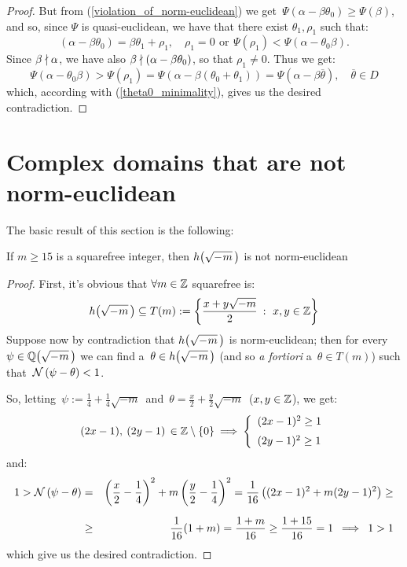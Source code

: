 \begin{proof}
But from (\ref{violation_of_norm-euclidean})
we get\, $\Psi(\alpha - \beta\theta_0) \geq
\Psi(\beta)$, \,and so, since $\Psi$ is
quasi-euclidean, we have that there exist
$\theta_1, \rho_1$ such that:
$$
(\alpha - \beta\theta_0) = \beta\theta_1 + \rho_1,
\quad\! \rho_1 = 0\ \,\textrm{or}\, \ \Psi(\rho_1)
< \Psi(\alpha - \theta_0\beta).
$$
Since $\beta \nmid \alpha$, we have also
$\beta \nmid (\alpha - \beta\theta_0)$, so
that $\rho_1 \ne 0$. Thus we get:
$$
\Psi(\alpha - \theta_0\beta) > \Psi(\rho_1) =
\Psi\left(\alpha - \beta(\theta_0 + \theta_1)\right)
= \Psi(\alpha - \beta\overline{\theta}),
\quad\!\! \overline{\theta} \in D
$$
which, according with (\ref{theta0_minimality}), gives
us the desired contradiction.
%
\end{proof}

\section{Complex domains that are not norm-euclidean}%
\label{not_norm-euclidean_complex_domains}

The basic result of this section is the following:

\begin{thm}
If $m \geq 15$ is a squarefree integer, then $\hhm{m}$ is
not norm-euclidean
\end{thm}

\begin{proof}
%
First, it's obvious that $\forall m \in \mathbb{Z}$ squarefree is:
$$
\hhm{m} \subseteq T(m):=
\left\{ \frac{x + y\sqrt{-m}}{2}\: :\ x, y \in \Z \right\}
$$
Suppose now by contradiction that $\hhm{m}$ is norm-euclidean;
then for every $\psi \in \QQM{m}$ we can find a\, $\theta \in \hhm{m}$
(and so \textit{\/a fortiori} a\, $\theta \in T(m)$)
such that\, $\mathcal{N}\left(\psi - \theta\right) < 1$.

So, letting\, $\psi := \frac{1}{4}+\frac{1}{4}\sqrt{-m}$
\,and\, $\theta = \frac{x}{2} + \frac{y}{2}\sqrt{-m}$\,
($x, y \in \mathbb{Z}$), we get: \smallskip
$$
(2x - 1),\: (2y - 1)\, \in \mathbb{Z}\setminus\left\{0\right\} \:\Longrightarrow\:
\left\{
\begin{array}{l}
(2x - 1)^2 \geq 1 \\[6pt]
(2y - 1)^2 \geq 1
\end{array}
\right.
$$
and:
%
\begin{eqnarray*}
1 > \mathcal{N}\left(\psi - \theta\right) & = &
\left(\frac{x}{2} - \frac{1}{4}\right)^2 +
m\left(\frac{y}{2} - \frac{1}{4}\right)^2 =
\frac{1}{16}\left( (2x - 1)^2 + m(2y - 1)^2 \right)
\geq \\[6pt]
& \geq & \frac{1}{16}(1 + m) = \frac{1 + m}{16}
\geq \frac{1 + 15}{16} = 1 \;\:\Longrightarrow\:\; 1 > 1
\end{eqnarray*}
%
which give us the desired contradiction.
%
\end{proof}

